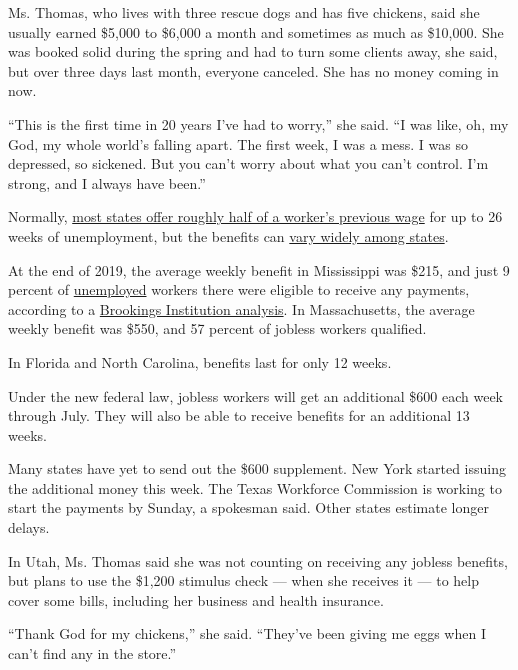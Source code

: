 Ms. Thomas, who lives with three rescue dogs and has five chickens, said
she usually earned \$5,000 to \$6,000 a month and sometimes as much as
\$10,000. She was booked solid during the spring and had to turn some
clients away, she said, but over three days last month, everyone
canceled. She has no money coming in now.

``This is the first time in 20 years I've had to worry,'' she said. ``I
was like, oh, my God, my whole world's falling apart. The first week, I
was a mess. I was so depressed, so sickened. But you can't worry about
what you can't control. I'm strong, and I always have been.''

Normally,
\href{https://www.cbpp.org/research/economy/policy-basics-how-many-weeks-of-unemployment-compensation-are-available}{most
states offer roughly half of a worker's previous wage} for up to 26
weeks of unemployment, but the benefits can
\href{https://oui.doleta.gov/unemploy/content/sigpros/2020-2029/January2020.pdf}{vary
widely among states}.

At the end of 2019, the average weekly benefit in Mississippi was \$215,
and just 9 percent of
\href{https://www.nytimes.com/2020/04/16/business/economy/unemployment-numbers-coronavirus.html}{unemployed}
workers there were eligible to receive any payments, according to a
\href{https://www.brookings.edu/blog/up-front/2020/04/07/how-does-unemployment-insurance-work-and-how-is-it-changing-during-the-coronavirus-pandemic/}{Brookings
Institution analysis}. In Massachusetts, the average weekly benefit was
\$550, and 57 percent of jobless workers qualified.

In Florida and North Carolina, benefits last for only 12 weeks.

Under the new federal law, jobless workers will get an additional \$600
each week through July. They will also be able to receive benefits for
an additional 13 weeks.

Many states have yet to send out the \$600 supplement. New York started
issuing the additional money this week. The Texas Workforce Commission
is working to start the payments by Sunday, a spokesman said. Other
states estimate longer delays.

In Utah, Ms. Thomas said she was not counting on receiving any jobless
benefits, but plans to use the \$1,200 stimulus check --- when she
receives it --- to help cover some bills, including her business and
health insurance.

``Thank God for my chickens,'' she said. ``They've been giving me eggs
when I can't find any in the store.''

